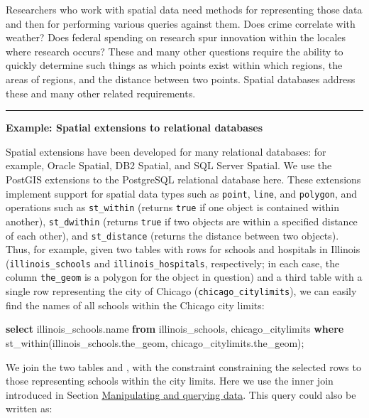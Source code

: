 \documentclass[]{krantz}
\newenvironment{Shaded}{\begin{snugshade}}{\end{snugshade}}
\newcommand{\KeywordTok}[1]{\textcolor[rgb]{0.13,0.29,0.53}{\textbf{#1}}}
\newcommand{\NormalTok}[1]{#1}
\begin{document}
Researchers who work with spatial data need methods for representing
those data and then for performing various queries against them. Does
crime correlate with weather? Does federal spending on research spur
innovation within the locales where research occurs? These and many
other questions require the ability to quickly determine such things as
which points exist within which regions, the areas of regions, and the
distance between two points. Spatial databases address these and many
other related requirements.

\begin{center}\rule{0.5\linewidth}{\linethickness}\end{center}

\textbf{Example: Spatial extensions to relational databases}

Spatial extensions have been developed for many relational databases:
for example, Oracle Spatial, DB2 Spatial, and SQL Server Spatial. We use
the PostGIS extensions to the PostgreSQL relational database here. These
extensions implement support for spatial data types such as
\texttt{point}, \texttt{line}, and \texttt{polygon}, and operations such
as \texttt{st\_within} (returns \texttt{true} if one object is contained
within another), \texttt{st\_dwithin} (returns \texttt{true} if two
objects are within a specified distance of each other), and
\texttt{st\_distance} (returns the distance between two objects). Thus,
for example, given two tables with rows for schools and hospitals in
Illinois (\texttt{illinois\_schools} and \texttt{illinois\_hospitals},
respectively; in each case, the column \texttt{the\_geom} is a polygon
for the object in question) and a third table with a single row
representing the city of Chicago (\texttt{chicago\_citylimits}), we can
easily find the names of all schools within the Chicago city limits:

\begin{Shaded}
\begin{Highlighting}[]
\KeywordTok{select}\NormalTok{ illinois_schools.name}
  \KeywordTok{from}\NormalTok{ illinois_schools, chicago_citylimits}
  \KeywordTok{where}\NormalTok{ st_within(illinois_schools.the_geom,}
\NormalTok{                  chicago_citylimits.the_geom);}
\end{Highlighting}
\end{Shaded}

We join the two tables and , with the constraint constraining the
selected rows to those representing schools within the city limits. Here
we use the inner join introduced in Section
\protect\hyperlink{sec:db:sql}{Manipulating and querying data}. This
query could also be written as:
\end{document}

